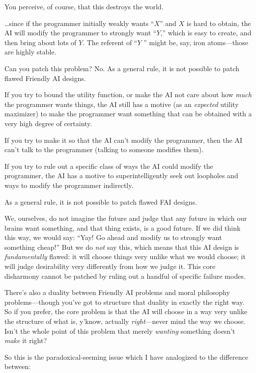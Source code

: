 {
 You perceive, of course, that this destroys the world.}

{
 \ldots since if the programmer initially weakly wants
``$X$'' and $X$ is hard to obtain, the
AI will modify the programmer to strongly want
``$Y$,'' which is easy to create, and
then bring about lots of $Y$. The referent of ``$Y$
'' might be, say, iron atoms---those are highly
stable.}

{
 Can you patch this problem? No. As a general rule, it is not
possible to patch flawed Friendly AI designs.}

{
 If you try to bound the utility function, or make the AI not care
about how \textit{much} the programmer wants things, the AI still has a
motive (as an \textit{expected} utility maximizer) to make the
programmer want something that can be obtained with a very high degree
of certainty.}

{
 If you try to make it so that the AI can't modify
the programmer, then the AI can't talk to the
programmer (talking to someone modifies them).}

{
 If you try to rule out a specific class of ways the AI could
modify the programmer, the AI has a motive to superintelligently seek
out loopholes and ways to modify the programmer indirectly.}

{
 As a general rule, it is not possible to patch flawed FAI
designs.}

{
 We, ourselves, do not imagine the future and judge that any future
in which our brains want something, and that thing exists, is a good
future. If we did think this way, we would say: ``Yay!
Go ahead and modify us to strongly want something
cheap!'' But we do \textit{not} say this, which means
that this AI design is \textit{fundamentally} flawed: it will choose
things very unlike what we would choose; it will judge desirability
very differently from how we judge it. This core disharmony cannot be
patched by ruling out a handful of specific failure modes.}

{
 There's also a duality between Friendly AI
problems and moral philosophy problems---though you've
got to structure that duality in exactly the right way. So if you
prefer, the core problem is that the AI will choose in a way very
unlike the structure of what is, y'know, actually
\textit{right}{}---never mind the way we choose. Isn't
the whole point of this problem that merely \textit{wanting} something
doesn't \textit{make} it right?}

{
 So this is the paradoxical-seeming issue which I have analogized
to the difference between:}

